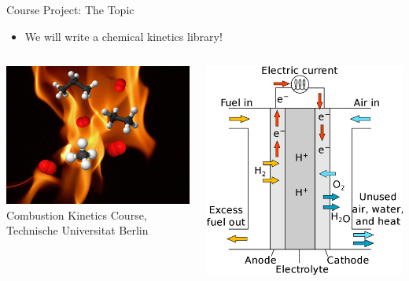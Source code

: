 \documentclass[onlymath, nologo]{beamer}
\begin{document}
  \begin{frame}{Course Project:  The Topic}
    \begin{itemize}
      \item We will write a chemical kinetics library!
    \end{itemize}
    \begin{columns}[c]
      \begin{column}{0.5\textwidth}
        \centering
        \includegraphics[width=\textwidth]{combustion.png} \hfill \\
        \tiny Combustion Kinetics Course, Technische Universitat Berlin
      \end{column}
      \begin{column}{0.5\textwidth}
        \centering
        \includegraphics[width=\textwidth]{PEM_fuel_cell.png} \hfill \\

\end{column}
\end{columns}
\end{frame}
\end{document}
